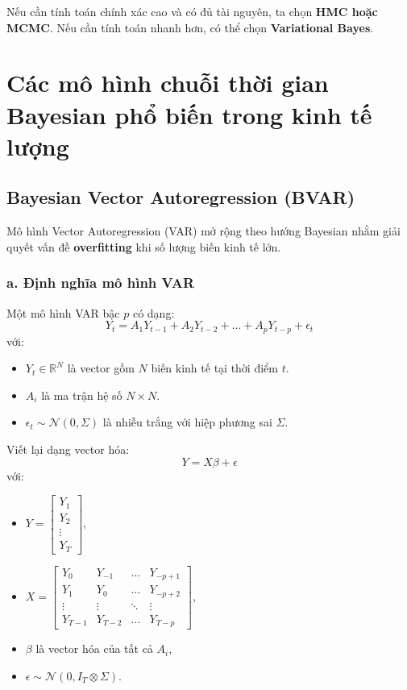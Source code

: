 Nếu cần tính toán chính xác cao và có đủ tài nguyên, ta chọn \textbf{HMC hoặc MCMC}. Nếu cần tính toán nhanh hơn, có thể chọn \textbf{Variational Bayes}.


\section{Các mô hình chuỗi thời gian Bayesian phổ biến trong kinh tế lượng}
\subsection{Bayesian Vector Autoregression (BVAR)}
Mô hình Vector Autoregression (VAR) mở rộng theo hướng Bayesian nhằm giải quyết vấn đề \textbf{overfitting} khi số lượng biến kinh tế lớn.

\subsubsection{a. Định nghĩa mô hình VAR}
Một mô hình VAR bậc $p$ có dạng:
\begin{equation}
    Y_t = A_1 Y_{t-1} + A_2 Y_{t-2} + \dots + A_p Y_{t-p} + \epsilon_t
\end{equation}
với:
\begin{itemize}
    \item $Y_t \in \mathbb{R}^N$ là vector gồm $N$ biến kinh tế tại thời điểm $t$.
    \item $A_i$ là ma trận hệ số $N \times N$.
    \item $\epsilon_t \sim \mathcal{N}(0, \Sigma)$ là nhiễu trắng với hiệp phương sai $\Sigma$.
\end{itemize}
Viết lại dạng vector hóa:
\begin{equation}
    Y = X \beta + \epsilon
\end{equation}
với:
\begin{itemize}
    \item $Y = \begin{bmatrix} Y_1 \\ Y_2 \\ \vdots \\ Y_T \end{bmatrix}$,
    \item $X = \begin{bmatrix} Y_0 & Y_{-1} & \dots & Y_{-p+1} \\ Y_1 & Y_0 & \dots & Y_{-p+2} \\ \vdots & \vdots & \ddots & \vdots \\ Y_{T-1} & Y_{T-2} & \dots & Y_{T-p} \end{bmatrix}$,
    \item $\beta$ là vector hóa của tất cả $A_i$,
    \item $\epsilon \sim \mathcal{N}(0, I_T \otimes \Sigma)$.
\end{itemize}

